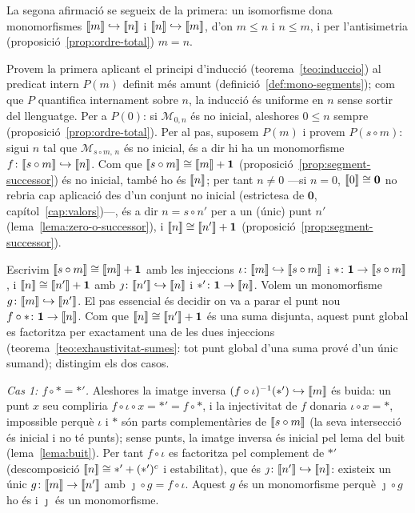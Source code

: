 \begin{prova}
La segona afirmació se segueix de la primera: un isomorfisme dona
monomorfismes \(\llbracket m\rrbracket\hookrightarrow\llbracket n\rrbracket\) i
\(\llbracket n\rrbracket\hookrightarrow\llbracket m\rrbracket\), d'on \(m\le n\) i \(n\le m\), i per
l'antisimetria (proposició~\ref{prop:ordre-total}) \(m=n\).

Provem la primera aplicant el principi d'inducció
(teorema~\ref{teo:induccio}) al predicat intern \(P(m)\) definit més amunt
(definició~\ref{def:mono-segments}); com que \(P\) quantifica internament
sobre \(n\), la inducció és uniforme en \(n\) sense sortir del llenguatge.
Per a \(P(0)\): si \(\mathcal M_{0,n}\) és no inicial, aleshores \(0\le n\)
sempre (proposició~\ref{prop:ordre-total}). Per al pas, suposem \(P(m)\) i
provem \(P(s\circ m)\): sigui \(n\) tal que \(\mathcal M_{s\circ m,\,n}\)
és no inicial, és a dir hi ha un monomorfisme
\(f\colon\llbracket s\circ m\rrbracket\hookrightarrow\llbracket n\rrbracket\). Com que \(\llbracket s\circ m\rrbracket\cong\llbracket m\rrbracket+\mathbf1\)
(proposició~\ref{prop:segment-successor}) és no inicial, també ho és
\(\llbracket n\rrbracket\); per tant \(n\ne0\) ---si \(n=0\), \(\llbracket 0\rrbracket\cong\mathbf0\) no rebria cap
aplicació des d'un conjunt no inicial (estrictesa de \(\mathbf0\),
capítol~\ref{cap:valors})---, és a dir \(n=s\circ n'\) per a un (únic)
punt \(n'\) (lema~\ref{lema:zero-o-successor}), i
\(\llbracket n\rrbracket\cong\llbracket n'\rrbracket+\mathbf1\)
(proposició~\ref{prop:segment-successor}).

Escrivim \(\llbracket s\circ m\rrbracket\cong\llbracket m\rrbracket+\mathbf1\) amb les injeccions
\(\iota\colon\llbracket m\rrbracket\hookrightarrow\llbracket s\circ m\rrbracket\) i
\(\ast\colon\mathbf1\to\llbracket s\circ m\rrbracket\), i
\(\llbracket n\rrbracket\cong\llbracket n'\rrbracket+\mathbf1\) amb
\(\jmath\colon\llbracket n'\rrbracket\hookrightarrow\llbracket n\rrbracket\) i
\(\ast'\colon\mathbf1\to\llbracket n\rrbracket\). Volem un monomorfisme
\(g\colon\llbracket m\rrbracket\hookrightarrow\llbracket n'\rrbracket\). El pas essencial és decidir on
va a parar el punt nou \(f\circ\ast\colon\mathbf1\to\llbracket n\rrbracket\). Com que
\(\llbracket n\rrbracket\cong\llbracket n'\rrbracket+\mathbf1\) és una suma disjunta, aquest punt global
es factoritza per exactament una de les dues injeccions
(teorema~\ref{teo:exhaustivitat-sumes}: tot punt global d'una suma prové
d'un únic sumand); distingim els dos casos.

\emph{Cas 1: \(f\circ\ast=\ast'\).} Aleshores la imatge inversa
\((f\circ\iota)^{-1}(\ast')\hookrightarrow\llbracket m\rrbracket\) és buida: un punt
\(x\) seu compliria \(f\circ\iota\circ x=\ast'=f\circ\ast\), i la
injectivitat de \(f\) donaria \(\iota\circ x=\ast\), impossible perquè
\(\iota\) i \(\ast\) són parts complementàries de \(\llbracket s\circ m\rrbracket\) (la
seva intersecció és inicial i no té punts); sense punts, la imatge
inversa és inicial pel lema del buit (lema~\ref{lema:buit}). Per tant
\(f\circ\iota\) es factoritza pel complement de \(\ast'\) (descomposició
\(\llbracket n\rrbracket\cong\ast'+(\ast')^c\) i estabilitat), que és
\(\jmath\colon\llbracket n'\rrbracket\hookrightarrow\llbracket n\rrbracket\):
existeix un únic \(g\colon\llbracket m\rrbracket\to\llbracket n'\rrbracket\) amb \(\jmath\circ
g=f\circ\iota\). Aquest \(g\) és un monomorfisme perquè \(\jmath\circ g\)
ho és i \(\jmath\) és un monomorfisme.


\end{prova}
